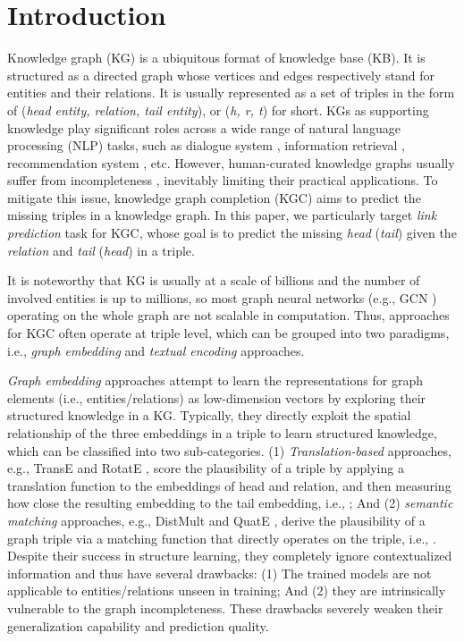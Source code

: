 \documentclass[sigconf]{acmart}
\begin{document}
\section{Introduction} \label{sec:intro}

Knowledge graph (KG) is a ubiquitous format of knowledge base (KB). It is structured as a directed graph whose vertices and edges respectively stand for entities and their relations. It is usually represented as a set of triples in the form of (\textit{head entity, relation, tail entity}), or (\textit{h, r, t}) for short. 
KGs as supporting knowledge play significant roles across a wide range of natural language processing (NLP) tasks, such as dialogue system \cite{he2017dialogue}, information retrieval \cite{xiong2017IR}, recommendation system \cite{zhang2016RecSys}, etc. 
However, human-curated knowledge graphs usually suffer from incompleteness \cite{socher2013kgc}, inevitably limiting their practical applications. 
To mitigate this issue, knowledge graph completion (KGC) aims to predict the missing triples in a knowledge graph. In this paper, we particularly target \textit{link prediction} task for KGC, whose goal is to predict the missing \textit{head} (\textit{tail}) given the \textit{relation} and \textit{tail} (\textit{head}) in a triple.

It is noteworthy that KG \cite{db/freebase, db/YAGO, db/Wikidata} is usually at a scale of billions and the number of involved entities is up to millions, so most graph neural networks (e.g., GCN \cite{GCN}) operating on the whole graph are not scalable in computation.
Thus, approaches for KGC often operate at triple level, which can be grouped into two paradigms, i.e., \textit{graph embedding} and \textit{textual encoding} approaches. 

\textit{Graph embedding} approaches attempt to learn the representations for graph elements (i.e., entities/relations) as low-dimension vectors by exploring their structured knowledge in a KG. 
Typically, they directly exploit the spatial relationship of the three embeddings in a triple to learn structured knowledge, which can be classified into two sub-categories. 
(1) \emph{Translation-based} approaches, e.g., TransE \cite{TransE} and RotatE \cite{sun2019rotate}, score the plausibility of a triple by applying a translation function to the embeddings of head and relation, and then measuring how close the resulting embedding to the tail embedding, i.e., ; 
And (2) \emph{semantic matching} approaches, e.g., DistMult \cite{yang2014DistMult} and QuatE \cite{QuatE}, derive the plausibility of a graph triple via a matching function that directly operates on the triple, i.e., . 
Despite their success in structure learning, they completely ignore contextualized information and thus have several drawbacks: 
(1) The trained models are not applicable to entities/relations unseen in training; And (2) they are intrinsically vulnerable to the graph incompleteness.
These drawbacks severely weaken their generalization capability and prediction quality.
\end{document}
